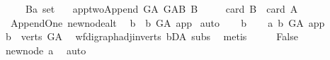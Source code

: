 \begin{isabellebody}
\ \ \ \ \ B{\isacharcolon}{\kern0pt}{\isacharcolon}{\kern0pt}{\isachardoublequoteopen}{\isacharprime}{\kern0pt}a\ set{\isachardoublequoteclose}\isanewline
\ \ \ app{\isacharunderscore}{\kern0pt}two{\isacharcolon}{\kern0pt}{\isachardoublequoteopen}Append\ G{\isacharunderscore}{\kern0pt}A\ G{\isacharunderscore}{\kern0pt}AB\ B{\isachardoublequoteclose}\isanewline
\ \ \ \ \ {\isachardoublequoteopen}card\ B\ {\isasymle}\ card\ A{\isachardoublequoteclose}%
\isadelimdocument
%
\endisadelimdocument
%
\isatagdocument
%
\isamarkuptrue%
%
\endisatagdocument
{\isafolddocument}%
%
\isadelimdocument
%
\endisadelimdocument
{}\isamarkupfalse%
\ {\isacharparenleft}{\kern0pt}\ Append{\isacharunderscore}{\kern0pt}One{\isacharparenright}{\kern0pt}\ new{\isacharunderscore}{\kern0pt}node{\isacharunderscore}{\kern0pt}alt{\isacharcolon}{\kern0pt}\isanewline
\ \ {\isachardoublequoteopen}{\isacharparenleft}{\kern0pt}{\isasymforall}b{\isachardot}{\kern0pt}\ {\isasymnot}\ b\ {\isasymrightarrow}\isactrlbsub G{\isacharunderscore}{\kern0pt}A\isactrlesub \ app{\isacharparenright}{\kern0pt}{\isachardoublequoteclose}\ \isanewline
%
\isadelimproof
%
\endisadelimproof
%
\isatagproof
{}\isamarkupfalse%
{\isacharparenleft}{\kern0pt}auto{\isacharparenright}{\kern0pt}\isanewline
\ \ \isamarkupfalse%
\ b\isanewline
\ \ \isamarkupfalse%
\ a{}{\isacharcolon}{\kern0pt}\ {\isachardoublequoteopen}b\ {\isasymrightarrow}\isactrlbsub G{\isacharunderscore}{\kern0pt}A\isactrlesub \ app{\isachardoublequoteclose}\isanewline
\ \ \isamarkupfalse%
\ \isamarkupfalse%
\ {\isachardoublequoteopen}b\ {\isasymin}\ verts\ G{\isacharunderscore}{\kern0pt}A{\isachardoublequoteclose}\ \isamarkupfalse%
\ wf{\isacharunderscore}{\kern0pt}digraph{\isachardot}{\kern0pt}adj{\isacharunderscore}{\kern0pt}in{\isacharunderscore}{\kern0pt}verts{\isacharparenleft}{\kern0pt}{}{\isacharparenright}{\kern0pt}\ bD{\isacharunderscore}{\kern0pt}A\ subs{\isacharparenleft}{\kern0pt}{}{\isacharparenright}{\kern0pt}\ \isamarkupfalse%
\ metis\isanewline
\ \ \isamarkupfalse%
\ \isamarkupfalse%
\ {\isachardoublequoteopen}False{\isachardoublequoteclose}\ \isamarkupfalse%
\ new{\isacharunderscore}{\kern0pt}node\ a{}\ \isamarkupfalse%
\ auto\isanewline
{}\isamarkupfalse%
%
\endisatagproof

\end{isabellebody}
